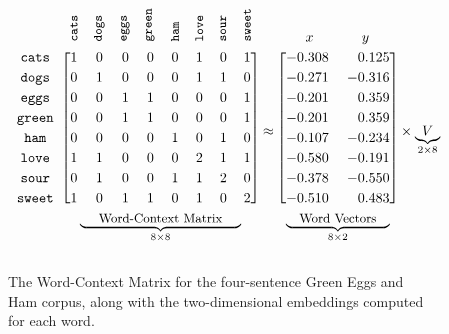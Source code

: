 \documentclass[11pt]{article}
\newcommand*\rot{\rotatebox{90}}
\begin{document}
\begin{figure}[ht!]
\centering
	\[\arraycolsep=1.8pt\def\arraystretch{1.2}
	\begin{blockarray}{ccccccccc}
		& \rot{\texttt{\small{cats}}} & \rot{\texttt{\small{dogs}}} & \rot{\texttt{\small{eggs}}} & \rot{\texttt{\small{green}}} & \rot{\texttt{\small{ham}}} & \rot{\texttt{\small{love}}} & \rot{\texttt{\small{sour}}} & \rot{\texttt{\small{sweet}}} \\
		\begin{block}{c[cccccccc]}
\texttt{cats} & 1 & 0 & 0 & 0 & 0 & 1 & 0 & 1 \\
\texttt{dogs} & 0 & 1 & 0 & 0 & 0 & 1 & 1 & 0 \\
\texttt{eggs} & 0 & 0 & 1 & 1 & 0 & 0 & 0 & 1 \\
\texttt{green} & 0 & 0 & 1 & 1 & 0 & 0 & 0 & 1 \\
\texttt{ham} & 0 & 0 & 0 & 0 & 1 & 0 & 1 & 0 \\
\texttt{love} & 1 & 1 & 0 & 0 & 0 & 2 & 1 & 1 \\
\texttt{sour} & 0 & 1 & 0 & 0 & 1 & 1 & 2 & 0 \\
\texttt{sweet} & 1 & 0 & 1 & 1 & 0 & 1 & 0 & 2 \\
		\end{block} & \BAmulticolumn{8}{c}{\underbrace{\small\text{\phantom{Wo}Word-Context Matrix\phantom{Wo}}}_{8 \times 8}} \\
	\end{blockarray}
	\approx
	\begin{blockarray}{c@{\hspace{3mm}}c}
		\rot{\phantom{\texttt{\small{green}}}}x~ & ~y \\
		\begin{block}{[r@{\hspace{2mm}}r]}
			-0.308 &  0.125 \\
			-0.271 & -0.316 \\
			-0.201 &  0.359 \\
			-0.201 &  0.359 \\
			-0.107 & -0.234 \\
			-0.580 & -0.191 \\
			-0.378 & -0.550 \\
			-0.510 & 0.483 \\
		\end{block}
		\BAmulticolumn{2}{c}{\underbrace{\small\text{\phantom{W}Word Vectors\phantom{W}}}_{8 \times 2}} \\
	\end{blockarray}
	\times \underbrace{V}_{2 \times 8}
	\]
\caption{The Word-Context Matrix for the four-sentence Green Eggs and Ham corpus, along with the two-dimensional embeddings computed for each word.}
\label{fig:eggs-matrix}
\end{figure}
\end{document}
